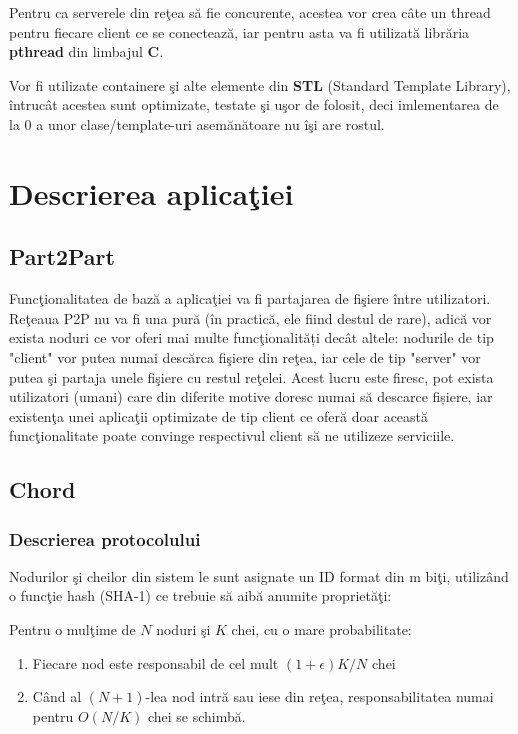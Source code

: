\documentclass[runningheads]{llncs}
\begin{document}
Pentru ca serverele din reţea să fie concurente, acestea vor crea câte un thread pentru fiecare client ce se conectează, iar pentru asta va fi utilizată librăria \textbf{pthread} din limbajul \textbf{C}.

Vor fi utilizate containere şi alte elemente din \textbf{STL} (Standard Template Library), întrucât acestea sunt optimizate, testate şi uşor de folosit, deci imlementarea de la 0 a unor clase/template-uri asemănătoare nu îşi are rostul.

\section{Descrierea aplicaţiei}

\subsection{Part2Part}

Funcţionalitatea de bază a aplicaţiei va fi partajarea de fişiere între utilizatori. Reţeaua P2P nu va fi una pură (în practică, ele fiind destul de rare), adică vor exista noduri ce vor oferi mai multe funcţionalități decât altele: nodurile de tip "client" vor putea numai descărca fişiere din reţea, iar cele de tip "server" vor putea şi partaja unele fişiere cu restul reţelei. Acest lucru este firesc, pot exista utilizatori (umani) care din diferite motive doresc numai să descarce fișiere, iar existenţa unei aplicaţii optimizate de tip client ce oferă doar această funcţionalitate poate convinge respectivul client să ne utilizeze serviciile.

\subsection{Chord}

\subsubsection{Descrierea protocolului}

Nodurilor şi cheilor din sistem le sunt asignate un ID format din m biţi, utilizând o funcţie hash (SHA-1) ce trebuie să aibă anumite proprietăţi:

Pentru o mulţime de ${N}$ noduri şi ${K}$ chei, cu o mare probabilitate: \cite{ChordArticle}

\begin{enumerate}
  \item Fiecare nod este responsabil de cel mult $(1 + \epsilon)K/N$ chei
  \item Când al $(N+1)$-lea nod intră sau iese din reţea, responsabilitatea numai pentru $O(N/K)$ chei se schimbă.
\end{enumerate}
\end{document}
